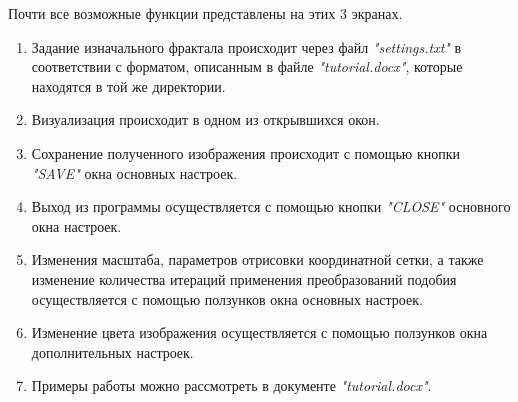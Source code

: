 \documentclass[a4paper,12pt,preview]{report} %
\begin{document}
\begin{enumerate}
		Почти все возможные функции представлены на этих 3 экранах.
		
		\begin{enumerate}
			\item Задание изначального фрактала происходит через файл \textit{"settings.txt"}
			в соответствии с форматом, описанным в файле \textit{"tutorial.docx"}, которые находятся в той же директории.
			
			\item Визуализация происходит в одном из открывшихся окон.
			
			\item Сохранение полученного изображения происходит с помощью кнопки \textit{"SAVE"} окна основных настроек.
			
			\item Выход из программы осуществляется с помощью кнопки \textit{"CLOSE"} основного окна настроек.
			
			\item Изменения масштаба, параметров отрисовки координатной сетки, а также изменение количества итераций применения преобразований подобия осуществляется с помощью ползунков окна основных настроек.
			
			\item Изменение цвета изображения осуществляется с помощью ползунков окна дополнительных настроек.
			
			\item Примеры работы можно рассмотреть в документе \textit{"tutorial.docx"}.
			
		\end{enumerate}
		
		
	\end{enumerate}
	
\end{document}
